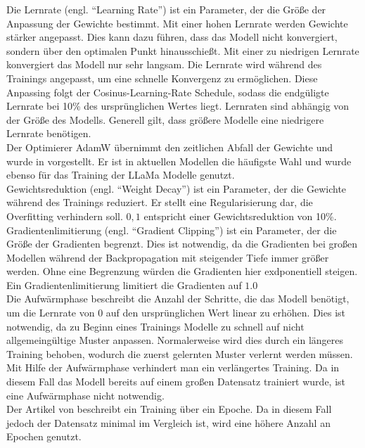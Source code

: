 Die Lernrate (engl. \enquote{Learning Rate}) ist ein Parameter, der die Größe der Anpassung der Gewichte bestimmt.
Mit einer hohen Lernrate werden Gewichte stärker angepasst.
Dies kann dazu führen, dass das Modell nicht konvergiert, sondern über den optimalen Punkt hinausschießt.
Mit einer zu niedrigen Lernrate konvergiert das Modell nur sehr langsam.
Die Lernrate wird während des Trainings angepasst, um eine schnelle Konvergenz zu ermöglichen.
Diese Anpassing folgt der Cosinus-Learning-Rate Schedule, sodass die endgüligte Lernrate bei 10\% des ursprünglichen Wertes liegt.
Lernraten sind abhängig von der Größe des Modells.
Generell gilt, dass größere Modelle eine niedrigere Lernrate benötigen.\\
Der Optimierer AdamW übernimmt den zeitlichen Abfall der Gewichte und wurde  in \citet{adamw} vorgestellt.
Er ist in aktuellen Modellen die häufigste Wahl und wurde ebenso für das Training der LLaMa Modelle genutzt.\\

Gewichtsreduktion (engl. \enquote{Weight Decay}) ist ein Parameter, der die Gewichte während des Trainings reduziert.
Er stellt eine Regularisierung dar, die Overfitting verhindern soll.
$0,1$ entspricht einer Gewichtsreduktion von 10\%.\\

Gradientenlimitierung (engl. \enquote{Gradient Clipping}) ist ein Parameter, der die Größe der Gradienten begrenzt.
Dies ist notwendig, da die Gradienten bei großen Modellen während der Backpropagation mit steigender Tiefe immer größer werden.
Ohne eine Begrenzung würden die Gradienten hier exdponentiell steigen.
Ein Gradientenlimitierung limitiert die Gradienten auf $1.0$\\

Die Aufwärmphase beschreibt die Anzahl der Schritte, die das Modell benötigt, um die Lernrate von $0$ auf den ursprünglichen Wert linear zu erhöhen.
Dies ist notwendig, da zu Beginn eines Trainings Modelle zu schnell auf nicht allgemeingültige Muster anpassen.
Normalerweise wird dies durch ein längeres Training behoben, wodurch die zuerst gelernten Muster verlernt werden müssen.
Mit Hilfe der Aufwärmphase verhindert man ein verlängertes Training.
Da in diesem Fall das Modell bereits auf einem großen Datensatz trainiert wurde, ist eine Aufwärmphase nicht notwendig.\\

Der Artikel von \citet{llama} beschreibt ein Training über ein Epoche.
Da in diesem Fall jedoch der Datensatz minimal im Vergleich ist, wird eine höhere Anzahl an Epochen genutzt.\\

